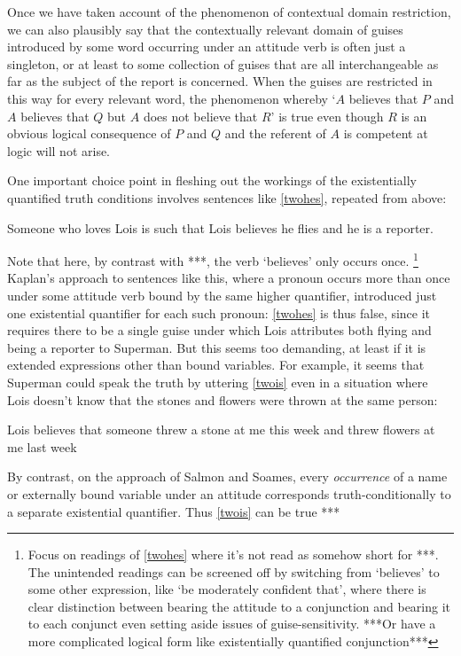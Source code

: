\documentclass[If.tex]{subfiles}
\begin{document}
Once we have taken account of the phenomenon of contextual domain restriction, we can also plausibly say that the contextually relevant domain of guises introduced by some word occurring under an attitude verb is often just a singleton, or at least to some collection of guises that are all interchangeable as far as the subject of the report is concerned.  When the guises are restricted in this way for every relevant word, the phenomenon whereby ‘$A$ believes that $P$ and $A$ believes that $Q$ but $A$ does not believe that $R$’ is true even though $R$ is an obvious logical consequence of $P$ and $Q$ and the referent of $A$ is competent at logic will not arise.



One important choice point in fleshing out the workings of the existentially quantified truth conditions involves sentences like \ref{twohes}, repeated from above:
\begin{prop}
    \nitem \label{twohes}
    Someone who loves Lois is such that Lois believes he flies and he is a reporter.
\end{prop}
Note that here, by contrast with ***, the verb ‘believes’ only occurs once.%
\footnote{Focus on readings of \ref{twohes} where it's not read as somehow short for ***.  The unintended readings can be screened off by switching from ‘believes’ to some other expression, like ‘be moderately confident that’, where there is clear distinction between bearing the attitude to a conjunction and bearing it to each conjunct even setting aside issues of guise-sensitivity.  ***Or have a more complicated logical form like existentially quantified conjunction***}
Kaplan's approach to sentences like this, where a pronoun occurs more than once under some attitude verb bound by the same higher quantifier, introduced just one existential quantifier for each such pronoun: \ref{twohes} is thus false, since it requires there to be a single guise under which Lois attributes both flying and being a reporter to Superman.  But this seems too demanding, at least if it is extended expressions other than bound variables.  For example, it seems that Superman could speak the truth by uttering \ref{twois} even in a situation where Lois doesn't know that the stones and flowers were thrown at the same person:
\begin{prop}
    \nitem \label{twois}
    Lois believes that someone threw a stone at me this week and threw flowers at me last week
\end{prop}
By contrast, on the approach of Salmon and Soames, every \emph{occurrence} of a name or externally bound variable under an attitude corresponds truth-conditionally to a separate existential quantifier.  Thus \ref{twois} can be true ***
\end{document}
